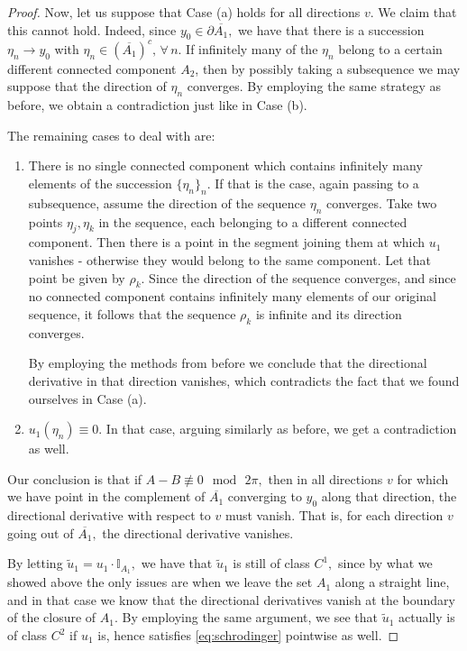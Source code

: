 \documentclass[a4paper,11pt,reqno]{amsart}
\numberwithin{equation}{section}
\theoremstyle{plain} %
\theoremstyle{definition} %
\theoremstyle{remark}
\begin{document}
\begin{proof}
Now, let us suppose that Case (a) holds for all directions $v$. We claim that this cannot hold. Indeed, since $y_0 \in \partial \overline{A_1},$ we have that there is a succession $\eta_n \to y_0$ with $\eta_n \in (\overline{A_1})^c, \, \forall \, n$. If infinitely many of the $\eta_n$ belong to a certain different connected component $A_2$, then by possibly taking a subsequence we may suppose that the direction of $\eta_n$ converges. By employing the same strategy as before, we obtain a contradiction just like in Case (b). 

The remaining cases to deal with are: 

\begin{enumerate}
    \item[(i)] There is no single connected component which contains infinitely many elements of the succession $\{\eta_n\}_n$. If that is the case, again passing to a subsequence, assume the direction of the sequence $\eta_n$ converges. Take two points $\eta_j,\eta_k$ in the sequence, each belonging to a different connected component. Then there is a point in the segment joining them at which $u_1$ vanishes - otherwise they would belong to the same component. Let that point be given by $\rho_k$. Since the direction of the sequence converges, and since no connected component contains infinitely many elements of our original sequence, it follows that the sequence $\rho_k$ is infinite and its direction converges. 

    By employing the methods from before we conclude that the directional derivative in that direction vanishes, which contradicts the fact that we found ourselves in Case (a). 

    \item[(ii)] $u_1(\eta_n) \equiv 0.$ In that case, arguing similarly as before, we get a contradiction as well. 
\end{enumerate}

Our conclusion is that if $A-B \not\equiv 0 \mod \, 2\pi,$ then in all directions $v$ for which we have point in the complement of $\overline{A_1}$ converging to $y_0$ along that direction, the directional derivative with respect to $v$ must vanish. That is, for each direction $v$ going out of $\overline{A_1},$ the directional derivative vanishes. 

By letting $\tilde{u}_1 = u_1 \cdot \mathbb{I}_{A_1},$ we have that $\tilde{u}_1$ is still of class $C^1,$ since by what we showed above the only issues are when we leave the set $A_1$ along a straight line, and in that case we know that the directional derivatives vanish at the boundary of the closure of $A_1$. By employing the same argument, we see that $\tilde{u}_1$ actually is of class $C^2$ if $u_1$ is, hence satisfies \eqref{eq:schrodinger} pointwise as well. 


\end{proof}
\end{document}
